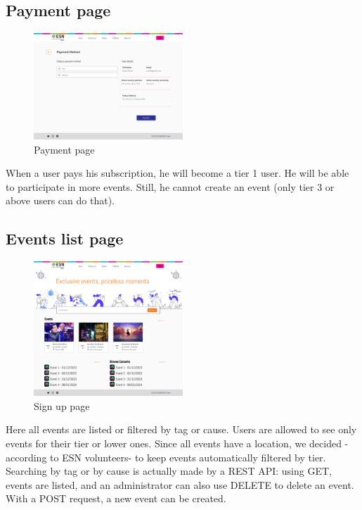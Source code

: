 \subsection{Payment page}
\begin{figure}[H]
    \centering
    \includegraphics[width=0.5\textwidth]{images/PaymentMethod.png}
    \caption{Payment page}
    \label{fig:payment}
\end{figure}
When a user pays his subscription, he will become a tier 1 user. He will be able to participate in more
events. Still, he cannot create an event (only tier 3 or above users can do that). 
\subsection{Events list page}
\begin{figure}[H]
    \centering
    \includegraphics[width=0.5\textwidth]{images/EventList.png}
    \caption{Sign up page}
    \label{fig:events}
\end{figure}
Here all events are listed or filtered by tag or cause. Users are allowed to see only events for their tier
or lower ones. Since all events have a location, we decided -according to ESN volunteers- to keep
events automatically filtered by tier.\\
Searching by tag or by cause is actually made by a REST API: using GET, events are listed, and an administrator
can also use DELETE to delete an event. With a POST request, a new event can be created.\\
